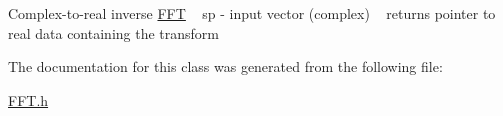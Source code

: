Complex-\/to-\/real inverse \hyperlink{class_aurora_1_1_f_f_t}{F\+FT} ~\newline
sp -\/ input vector (complex) ~\newline
returns pointer to real data containing the transform 

The documentation for this class was generated from the following file\+:\begin{DoxyCompactItemize}
\item 
\hyperlink{_f_f_t_8h}{F\+F\+T.\+h}\end{DoxyCompactItemize}
